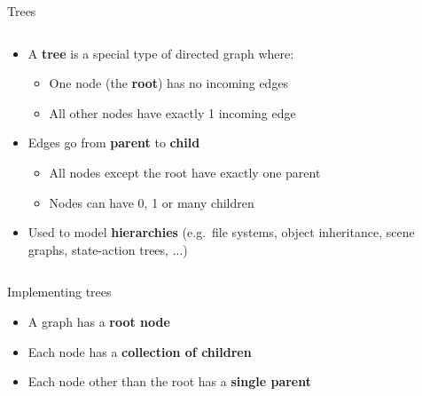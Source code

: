 \begin{frame}{Trees}
\begin{columns}
		\begin{column}{0.68\textwidth}
			\begin{itemize}
				\pause\item A \textbf{tree} is a special type of directed graph where:
					\begin{itemize}
						\pause\item One node (the \textbf{root}) has no incoming edges
						\pause\item All other nodes have exactly 1 incoming edge
					\end{itemize}
				\pause\item Edges go from \textbf{parent} to \textbf{child}
					\begin{itemize}
						\pause\item All nodes except the root have exactly one parent
						\pause\item Nodes can have 0, 1 or many children
					\end{itemize}
				\pause\item Used to model \textbf{hierarchies} (e.g.\ file systems, object inheritance, scene graphs, state-action trees, ...)
			\end{itemize}
		\end{column}
	\end{columns}
\end{frame}

\begin{frame}{Implementing trees}
	\begin{itemize}
		\pause\item A graph has a \textbf{root node}
		\pause\item Each node has a \textbf{collection of children}
		\pause\item Each node other than the root has a \textbf{single parent}
	\end{itemize}
\end{frame}

